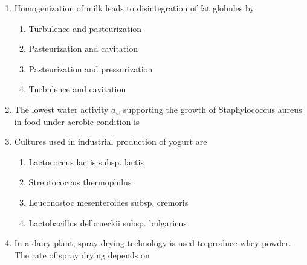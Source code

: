 \documentclass[journal,12pt,onecolumn]{IEEEtran}
\theoremstyle{remark}
\begin{document}
\begin{enumerate}
    \item Homogenization of milk leads to disintegration of fat globules by

    \hfill{}
    \begin{enumerate}
        \item Turbulence and pasteurization
        \item Pasteurization and cavitation
        \item Pasteurization and pressurization
        \item Turbulence and cavitation
    \end{enumerate}

    \item The lowest water activity {$a_w$} supporting the growth of Staphylococcus aureus in food under aerobic condition is

    \hfill{}
    \begin{enumerate}
    \end{enumerate}

    \item Cultures used in industrial production of yogurt are

    \hfill{}
    \begin{enumerate}
        \item Lactococcus lactis subsp. lactis
        \item Streptococcus thermophilus
        \item Leuconostoc mesenteroides subsp. cremoris
        \item Lactobacillus delbrueckii subsp. bulgaricus
    \end{enumerate}

    \item In a dairy plant, spray drying technology is used to produce whey powder. The rate of spray drying depends on

    \hfill{}
    \begin{enumerate}
    \end{enumerate}


\end{enumerate}
\end{document}
